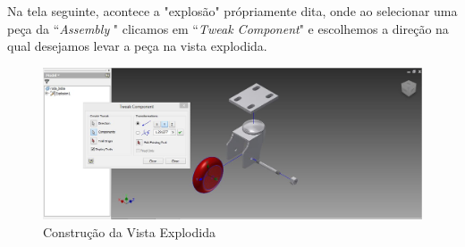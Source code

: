 	Na tela seguinte, acontece a "explos\~ao" pr\'opriamente dita, onde ao selecionar uma peça da ``\textit{Assembly} " clicamos em ``\textit{Tweak Component}" e escolhemos a dire\c{c}\~ao na qual desejamos levar a peça na vista explodida.
	\\
	\begin{figure}[h]
	\includegraphics[scale=0.3]{./include/chapters/sections/mec/section1/imgs/exp.jpg}
	\caption{Constru\c{c}\~ao da Vista Explodida}
	\label{Chass}
	\end{figure}

